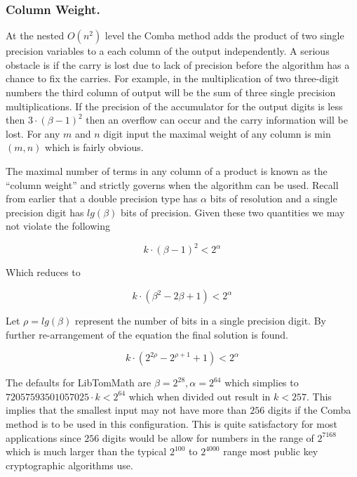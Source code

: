 \documentclass[b5paper]{book}
\begin{document}
\subsubsection{Column Weight.}
At the nested $O(n^2)$ level the Comba method adds the product of two single precision variables to a each column of the output 
independently.  A serious obstacle is if the carry is lost due to lack of precision before the algorithm has a chance to fix
the carries.  For example, in the multiplication of two three-digit numbers the third column of output will be the sum of
three single precision multiplications.  If the precision of the accumulator for the output digits is less then $3 \cdot (\beta - 1)^2$ then
an overflow can occur and the carry information will be lost.  For any $m$ and $n$ digit input the maximal weight of any column is 
min$(m, n)$ which is fairly obvious.

The maximal number of terms in any column of a product is known as the ``column weight'' and strictly governs when the algorithm can be used.  Recall
from earlier that a double precision type has $\alpha$ bits of resolution and a single precision digit has $lg(\beta)$ bits of precision.  Given these
two quantities we may not violate the following

\begin{equation}
k \cdot \left (\beta - 1 \right )^2 < 2^{\alpha}
\end{equation}

Which reduces to 

\begin{equation}
k \cdot \left ( \beta^2 - 2\beta + 1 \right ) < 2^{\alpha}
\end{equation}

Let $\rho = lg(\beta)$ represent the number of bits in a single precision digit.  By further re-arrangement of the equation the final solution is
found.

\begin{equation}
k \cdot \left (2^{2\rho} - 2^{\rho + 1} + 1 \right ) < 2^{\alpha}
\end{equation}

The defaults for LibTomMath are $\beta = 2^{28}, \alpha = 2^{64}$ which simplies to $72057593501057025 \cdot k < 2^{64}$ which when divided out
result in $k < 257$.  This implies that the smallest input may not have more than $256$ digits if the Comba method is to be used in
this configuration.  This is quite satisfactory for most applications since $256$ digits would be allow for numbers in the range of $2^{7168}$ 
which is much larger than the typical $2^{100}$ to $2^{4000}$ range most public key cryptographic algorithms use.  
\end{document}
